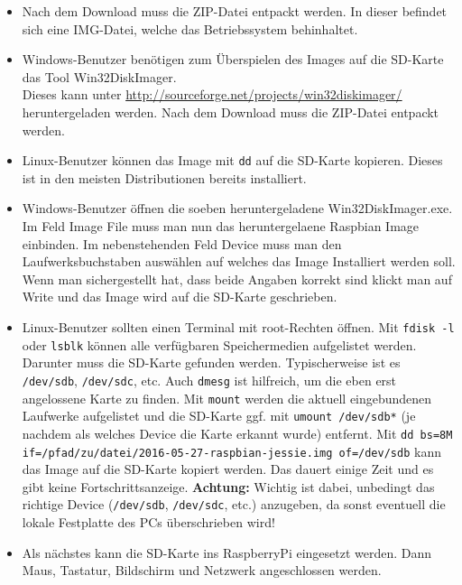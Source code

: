 \begin{itemize}
	\item {Nach dem Download muss die ZIP-Datei entpackt werden. In dieser befindet sich eine IMG-Datei, welche das Betriebssystem behinhaltet.}
	\item {Windows-Benutzer benötigen zum Überspielen des Images auf die SD-Karte das Tool Win32DiskImager.\\
		Dieses kann unter \url{http://sourceforge.net/projects/win32diskimager/} heruntergeladen werden. 
		Nach dem Download muss die ZIP-Datei entpackt werden.
		}
	\item {Linux-Benutzer können das Image mit \lstinline|dd| auf die SD-Karte kopieren. Dieses ist in den meisten Distributionen bereits installiert.
		}
	\item {Windows-Benutzer öffnen die soeben heruntergeladene Win32DiskImager.exe. Im Feld Image File muss man nun das heruntergelaene Raspbian Image einbinden. 
		Im nebenstehenden Feld Device muss man den Laufwerksbuchstaben auswählen auf welches das Image Installiert werden soll. 
		Wenn man sichergestellt hat, dass beide Angaben korrekt sind klickt man auf Write und das Image wird auf die SD-Karte geschrieben.
		}
	\item {Linux-Benutzer sollten einen Terminal mit root-Rechten öffnen. 
		Mit \lstinline|fdisk -l| oder \lstinline|lsblk| können alle verfügbaren Speichermedien aufgelistet werden. Darunter muss die SD-Karte gefunden werden.
		Typischerweise ist es \lstinline|/dev/sdb|, \lstinline|/dev/sdc|, etc.
		Auch \lstinline|dmesg| ist hilfreich, um die eben erst angelossene Karte zu finden. 
		Mit \lstinline|mount| werden die aktuell eingebundenen Laufwerke aufgelistet und 
		die SD-Karte ggf. mit \lstinline|umount /dev/sdb*| (je nachdem als welches Device die Karte erkannt wurde) entfernt.
		Mit \lstinline|dd bs=8M if=/pfad/zu/datei/2016-05-27-raspbian-jessie.img of=/dev/sdb| kann das Image auf die SD-Karte kopiert werden.
		Das dauert einige Zeit und es gibt keine Fortschrittsanzeige.
		\textbf{Achtung:} Wichtig ist dabei, unbedingt das richtige Device (\lstinline|/dev/sdb|, \lstinline|/dev/sdc|, etc.) anzugeben, 
		da sonst eventuell die lokale Festplatte des PCs überschrieben wird!
		}
	\item {Als nächstes kann die SD-Karte ins RaspberryPi eingesetzt werden. Dann Maus, Tastatur, Bildschirm und Netzwerk angeschlossen werden. 
}
\end{itemize}
